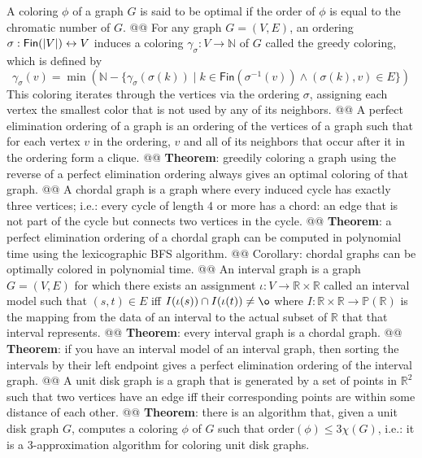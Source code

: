\documentclass[]{article}
\DeclarePairedDelimiter{\abs}{\lvert}{\rvert}
\newcommand{\textbs}[1]{{\sffamily\fontseries{sbc}\selectfont #1}}
\newcommand{\mbb}[1]{\ensuremath{\mathbb{#1}}}     %
\newcommand{\mrm}[1]{\ensuremath{\mathrm{#1}}}     %
\newcommand{\msf}[1]{\ensuremath{\mathsf{#1}}}     %
\newcommand{\define}[1]{\textbs{#1}}
\begin{document}
\begin{easylist}[itemize]
{  A coloring $\phi$ of a graph $G$ is said to be \define{optimal} if the order
  of $\phi$ is equal to the chromatic number of $G$.
}
@@ {%
  For any graph $G = (V, E)$, an ordering
  $\sigma : \msf{Fin}(\abs{V}) \leftrightarrow V$
  induces a coloring $\gamma_\sigma : V \to \mbb{N}$ of $G$ called the
  \define{greedy coloring}, which is defined by
  \begin{equation*}
  \gamma_\sigma(v) = \min (\mbb{N} - \{ \gamma_\sigma(\sigma(k)) \mid k \in \msf{Fin}(\sigma^{-1}(v)) \wedge (\sigma(k), v) \in E \})
  \end{equation*}
  This coloring iterates through the vertices via the ordering $\sigma$,
  assigning each vertex the smallest color that is not used by any of its
  neighbors.
}
@@ {%
  A \define{perfect elimination ordering} of a graph is an ordering of the
  vertices of a graph such that for each vertex $v$ in the ordering, $v$ and all
  of its neighbors that occur after it in the ordering form a clique.
}
@@ {%
  \textbf{Theorem}: greedily coloring a graph using the reverse of a perfect
  elimination ordering always gives an optimal coloring of that graph.
}
@@ {%
  A \define{chordal graph} is a graph where every induced cycle has exactly
  three vertices; i.e.: every cycle of length 4 or more has a \define{chord}: an
  edge that is not part of the cycle but connects two vertices in the cycle.
}
@@ {%
  \textbf{Theorem}: a perfect elimination ordering of a chordal graph can be
  computed in polynomial time using the \define{lexicographic BFS} algorithm.
}
@@ Corollary: chordal graphs can be optimally colored in polynomial time.
@@ {%
  An \define{interval graph} is a graph $G = (V, E)$ for which there exists an
  assignment $\iota : V \to \mbb{R} \times \mbb{R}$ called an
  \define{interval model} such that
  $(s, t) \in E$ iff $I(\iota(s)) \cap I(\iota(t)) \neq \o$
  where $I : \mbb{R} \times \mbb{R} \to \mbb{P}(\mbb{R})$
  is the mapping from the data of an interval to the actual subset
  of $\mbb{R}$ that that interval represents.
}
@@ \textbf{Theorem}: every interval graph is a chordal graph.
@@ {%
  \textbf{Theorem}: if you have an interval model of an interval graph, then
  sorting the intervals by their left endpoint gives a perfect elimination
  ordering of the interval graph.
}
@@ {%
  A \define{unit disk graph} is a graph that is generated by a set of points in
  $\mbb{R}^2$ such that two vertices have an edge iff their corresponding points
  are within some distance of each other.
}
@@ {%
  \textbf{Theorem}: there is an algorithm that, given a unit disk graph $G$,
  computes a coloring $\phi$ of $G$ such that $\mrm{order}(\phi) \le 3 \chi(G)$,
  i.e.: it is a 3-approximation algorithm for coloring unit disk graphs.
}
\end{easylist}
\end{document}
